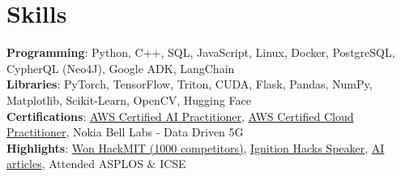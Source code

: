 \documentclass[letterpaper,10pt]{article}
\begin{document}
\section{Skills}
{\small
\textbf{Programming}: Python, C++, SQL, JavaScript, Linux, Docker, PostgreSQL, CypherQL (Neo4J), Google ADK, LangChain\\[2pt]
\textbf{Libraries}: PyTorch, TensorFlow, Triton, CUDA, Flask, Pandas, NumPy, Matplotlib, Scikit-Learn, OpenCV, Hugging Face\\[2pt]
\textbf{Certifications}: \href{https://www.credly.com/badges/1abae0cc-10fb-4b12-9405-22e4bc9e9b71/linked\_in\_profile}{AWS Certified AI Practitioner}, \href{https://www.credly.com/badges/3606867b-332f-46c2-8517-3a97a1b79989/linked\_in\_profile}{AWS Certified Cloud Practitioner}, Nokia Bell Labs - Data Driven 5G\\[2pt]
\textbf{Highlights}: \href{https://github.com/SachinVedGupta/Miti}{Won HackMIT (1000 competitors)}, \href{https://drive.google.com/drive/folders/1f-G2-GoIchHc\_OHzt8KHu216W8\_KEb4T?usp=sharing}{Ignition Hacks Speaker}, \href{https://medium.com/@sachinvgupta9}{AI articles}, Attended ASPLOS \& ICSE\\[2pt]
}
\end{document}
